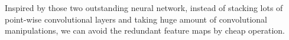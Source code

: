 Inspired by those two outstanding neural network\cite{19}\cite{20}, instead of stacking lots of point-wise convolutional layers and taking huge amount of convolutional manipulations, we can avoid the redundant feature maps by cheap operation. 


